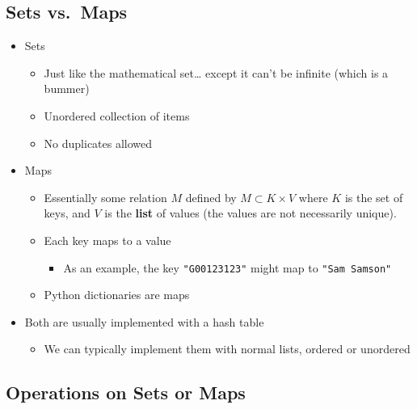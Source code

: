 \documentclass[
  10pt,
  english,
  letterpaper,
,tablecaptionabove
]{scrartcl}
\newcommand{\passthrough}[1]{#1}
\providecommand{\tightlist}{%
  \setlength{\itemsep}{0pt}\setlength{\parskip}{0pt}}
\begin{document}
\hypertarget{sets-vs.-maps}{%
\subsection{Sets vs.~Maps}\label{sets-vs.-maps}}

\begin{itemize}
\tightlist
\item
  Sets

  \begin{itemize}
  \tightlist
  \item
    Just like the mathematical set\ldots{} except it can't be infinite
    (which is a bummer)
  \item
    Unordered collection of items
  \item
    No duplicates allowed
  \end{itemize}
\item
  Maps

  \begin{itemize}
  \tightlist
  \item
    Essentially some relation \(M\) defined by \(M\subset K \times V\)
    where \(K\) is the set of keys, and \(V\) is the \textbf{list} of
    values (the values are not necessarily unique).
  \item
    Each key maps to a value

    \begin{itemize}
    \tightlist
    \item
      As an example, the key \passthrough{\lstinline!"G00123123"!} might
      map to \passthrough{\lstinline!"Sam Samson"!}
    \end{itemize}
  \item
    Python dictionaries are maps
  \end{itemize}
\item
  Both are usually implemented with a hash table

  \begin{itemize}
  \tightlist
  \item
    We can typically implement them with normal lists, ordered or
    unordered
  \end{itemize}
\end{itemize}

\hypertarget{operations-on-sets-or-maps}{%
\subsection{Operations on Sets or
Maps}\label{operations-on-sets-or-maps}}
\end{document}

